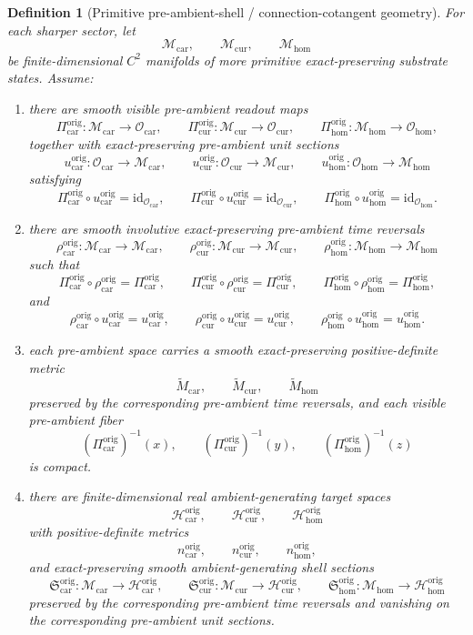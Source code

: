 \documentclass[11pt]{article}
\newcommand{\TensorObjClass}{\mathcal O_{\mathrm{car}}}
\newcommand{\CurObjClass}{\mathcal O_{\mathrm{cur}}}
\newcommand{\HomObjClass}{\mathcal O_{\mathrm{hom}}}
\newcommand{\TensorOriginSpace}{\mathcal M_{\mathrm{car}}}
\newcommand{\CurOriginSpace}{\mathcal M_{\mathrm{cur}}}
\newcommand{\HomOriginSpace}{\mathcal M_{\mathrm{hom}}}
\newcommand{\TensorOriginRead}{\Pi_{\mathrm{car}}^{\mathrm{orig}}}
\newcommand{\CurOriginRead}{\Pi_{\mathrm{cur}}^{\mathrm{orig}}}
\newcommand{\HomOriginRead}{\Pi_{\mathrm{hom}}^{\mathrm{orig}}}
\newcommand{\TensorOriginUnit}{u_{\mathrm{car}}^{\mathrm{orig}}}
\newcommand{\CurOriginUnit}{u_{\mathrm{cur}}^{\mathrm{orig}}}
\newcommand{\HomOriginUnit}{u_{\mathrm{hom}}^{\mathrm{orig}}}
\newcommand{\TensorOriginTimeRev}{\rho_{\mathrm{car}}^{\mathrm{orig}}}
\newcommand{\CurOriginTimeRev}{\rho_{\mathrm{cur}}^{\mathrm{orig}}}
\newcommand{\HomOriginTimeRev}{\rho_{\mathrm{hom}}^{\mathrm{orig}}}
\newcommand{\TensorOriginSpaceMetric}{\widetilde M_{\mathrm{car}}}
\newcommand{\CurOriginSpaceMetric}{\widetilde M_{\mathrm{cur}}}
\newcommand{\HomOriginSpaceMetric}{\widetilde M_{\mathrm{hom}}}
\newcommand{\TensorOriginTarget}{\mathcal H_{\mathrm{car}}^{\mathrm{orig}}}
\newcommand{\CurOriginTarget}{\mathcal H_{\mathrm{cur}}^{\mathrm{orig}}}
\newcommand{\HomOriginTarget}{\mathcal H_{\mathrm{hom}}^{\mathrm{orig}}}
\newcommand{\TensorOriginTargetMetric}{n_{\mathrm{car}}^{\mathrm{orig}}}
\newcommand{\CurOriginTargetMetric}{n_{\mathrm{cur}}^{\mathrm{orig}}}
\newcommand{\HomOriginTargetMetric}{n_{\mathrm{hom}}^{\mathrm{orig}}}
\newcommand{\TensorOriginSection}{\mathfrak S_{\mathrm{car}}^{\mathrm{orig}}}
\newcommand{\CurOriginSection}{\mathfrak S_{\mathrm{cur}}^{\mathrm{orig}}}
\newcommand{\HomOriginSection}{\mathfrak S_{\mathrm{hom}}^{\mathrm{orig}}}
\newtheorem{definition}{Definition}
\begin{document}
\begin{definition}[Primitive pre-ambient-shell / connection-cotangent geometry]
\label{def:origin_geometry}
For each sharper sector, let
\[
\TensorOriginSpace,\qquad
\CurOriginSpace,\qquad
\HomOriginSpace
\]
be finite-dimensional \(C^2\) manifolds of more primitive exact-preserving substrate states. Assume:
\begin{enumerate}
    \item there are smooth visible pre-ambient readout maps
    \[
    \TensorOriginRead:\TensorOriginSpace\to\TensorObjClass,\qquad
    \CurOriginRead:\CurOriginSpace\to\CurObjClass,\qquad
    \HomOriginRead:\HomOriginSpace\to\HomObjClass,
    \]
    together with exact-preserving pre-ambient unit sections
    \[
    \TensorOriginUnit:\TensorObjClass\to\TensorOriginSpace,\qquad
    \CurOriginUnit:\CurObjClass\to\CurOriginSpace,\qquad
    \HomOriginUnit:\HomObjClass\to\HomOriginSpace
    \]
    satisfying
    \[
    \TensorOriginRead\circ\TensorOriginUnit=\mathrm{id}_{\TensorObjClass},\qquad
    \CurOriginRead\circ\CurOriginUnit=\mathrm{id}_{\CurObjClass},\qquad
    \HomOriginRead\circ\HomOriginUnit=\mathrm{id}_{\HomObjClass}.
    \]
    \item there are smooth involutive exact-preserving pre-ambient time reversals
    \[
    \TensorOriginTimeRev:\TensorOriginSpace\to\TensorOriginSpace,\qquad
    \CurOriginTimeRev:\CurOriginSpace\to\CurOriginSpace,\qquad
    \HomOriginTimeRev:\HomOriginSpace\to\HomOriginSpace
    \]
    such that
    \[
    \TensorOriginRead\circ\TensorOriginTimeRev=\TensorOriginRead,\qquad
    \CurOriginRead\circ\CurOriginTimeRev=\CurOriginRead,\qquad
    \HomOriginRead\circ\HomOriginTimeRev=\HomOriginRead,
    \]
    and
    \[
    \TensorOriginTimeRev\circ\TensorOriginUnit=\TensorOriginUnit,\qquad
    \CurOriginTimeRev\circ\CurOriginUnit=\CurOriginUnit,\qquad
    \HomOriginTimeRev\circ\HomOriginUnit=\HomOriginUnit.
    \]
    \item each pre-ambient space carries a smooth exact-preserving positive-definite metric
    \[
    \TensorOriginSpaceMetric,\qquad
    \CurOriginSpaceMetric,\qquad
    \HomOriginSpaceMetric
    \]
    preserved by the corresponding pre-ambient time reversals, and each visible pre-ambient fiber
    \[
    (\TensorOriginRead)^{-1}(x),\qquad
    (\CurOriginRead)^{-1}(y),\qquad
    (\HomOriginRead)^{-1}(z)
    \]
    is compact.
    \item there are finite-dimensional real ambient-generating target spaces
    \[
    \TensorOriginTarget,\qquad
    \CurOriginTarget,\qquad
    \HomOriginTarget
    \]
    with positive-definite metrics
    \[
    \TensorOriginTargetMetric,\qquad
    \CurOriginTargetMetric,\qquad
    \HomOriginTargetMetric,
    \]
    and exact-preserving smooth ambient-generating shell sections
    \[
    \TensorOriginSection:\TensorOriginSpace\to\TensorOriginTarget,\qquad
    \CurOriginSection:\CurOriginSpace\to\CurOriginTarget,\qquad
    \HomOriginSection:\HomOriginSpace\to\HomOriginTarget
    \]
    preserved by the corresponding pre-ambient time reversals and vanishing on the corresponding pre-ambient unit sections.


\end{enumerate}
\end{definition}
\end{document}
